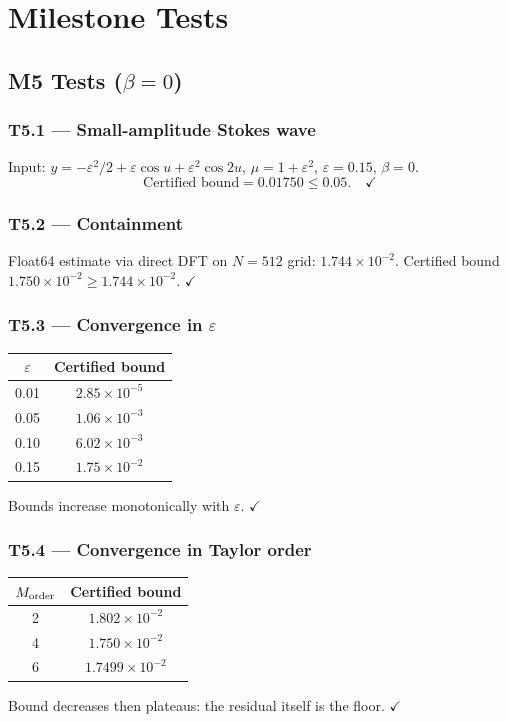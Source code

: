 \documentclass[11pt]{article}
\theoremstyle{definition}
\begin{document}
\section{Milestone Tests}

\subsection{M5 Tests (\texorpdfstring{$\beta=0$}{beta=0})}

\subsubsection*{T5.1 --- Small-amplitude Stokes wave}
Input: $y = -\varepsilon^2/2 + \varepsilon\cos u + \varepsilon^2\cos 2u$,
$\mu = 1+\varepsilon^2$, $\varepsilon = 0.15$, $\beta=0$.
\[
  \text{Certified bound} = 0.01750 \leq 0.05. \quad \checkmark
\]

\subsubsection*{T5.2 --- Containment}
Float64 estimate via direct DFT on $N=512$ grid: $1.744\times10^{-2}$.
Certified bound $1.750\times10^{-2} \geq 1.744\times10^{-2}$. $\checkmark$

\subsubsection*{T5.3 --- Convergence in $\varepsilon$}
\begin{center}
\begin{tabular}{cc}
\toprule
$\varepsilon$ & Certified bound \\
\midrule
0.01 & $2.85\times10^{-5}$ \\
0.05 & $1.06\times10^{-3}$ \\
0.10 & $6.02\times10^{-3}$ \\
0.15 & $1.75\times10^{-2}$ \\
\bottomrule
\end{tabular}
\end{center}
Bounds increase monotonically with $\varepsilon$. $\checkmark$

\subsubsection*{T5.4 --- Convergence in Taylor order}
\begin{center}
\begin{tabular}{cc}
\toprule
$M_{\rm order}$ & Certified bound \\
\midrule
2 & $1.802\times10^{-2}$ \\
4 & $1.750\times10^{-2}$ \\
6 & $1.7499\times10^{-2}$ \\
\bottomrule
\end{tabular}
\end{center}
Bound decreases then plateaus: the residual itself is the floor. $\checkmark$
\end{document}
